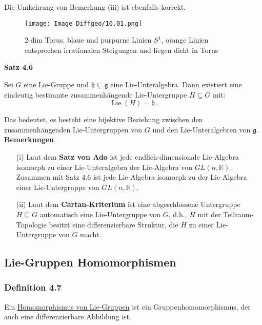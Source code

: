 \documentclass[fleqn, 12pt, letterpaper]{article}
\begin{document}
Die Umkehrung von Bemerkung (iii) ist ebenfalls korrekt.\\
  \begin{figure}[H]
    \centering
    \texttt{[image: Image Diffgeo/10.01.png]}
	\caption{2-dim Torus, blaue und purpurne Linien $S^1$, orange Linien entsprechen irrationalen Steigungen und liegen dicht in Torus}
 \end{figure}


\textbf{Satz 4.6}

Sei \( G \) eine Lie-Gruppe und \( \mathfrak{h} \subseteq \mathfrak{g} \) eine Lie-Unteralgebra. Dann existiert eine eindeutig bestimmte zusammenhängende Lie-Untergruppe \( H \subseteq G \) mit:
\[
\operatorname{Lie}(H) = \mathfrak{h}.
\]

Das bedeutet, es besteht eine bijektive Beziehung zwischen den zusammenhängenden Lie-Untergruppen von \( G \) und den Lie-Unteralgebren von \( \mathfrak{g} \).\\

\textbf{Bemerkungen}
\begin{itemize}
    \item[(i)] Laut dem \textbf{Satz von Ado} ist jede endlich-dimensionale Lie-Algebra isomorph zu einer Lie-Unteralgebra der Lie-Algebra von \( GL(n, \mathbb{R}) \). \\
    Zusammen mit Satz 4.6 ist jede Lie-Algebra isomorph zu der Lie-Algebra einer Lie-Untergruppe von \( GL(n, \mathbb{R}) \).

    \item[(ii)] Laut dem \textbf{Cartan-Kriterium} ist eine abgeschlossene Untergruppe \( H \subseteq G \) automatisch eine Lie-Untergruppe von \( G \), d.h., \( H \) mit der Teilraum-Topologie besitzt eine differenzierbare Struktur, die \( H \) zu einer Lie-Untergruppe von \( G \) macht.
\end{itemize}

\subsection{Lie-Gruppen Homomorphismen}

\subsubsection*{Definition 4.7}
Ein {\underline{Homomorphismus von Lie-Gruppen}} ist ein Gruppenhomomorphismus, der auch eine differenzierbare Abbildung ist. \\
\end{document}

